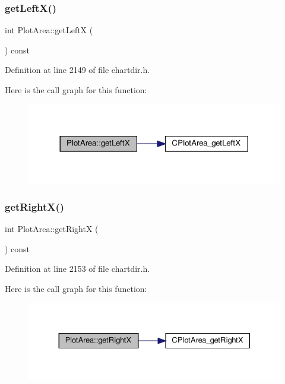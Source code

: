 \subsubsection{\texorpdfstring{get\+Left\+X()}{getLeftX()}}
{\footnotesize\ttfamily int Plot\+Area\+::get\+LeftX (\begin{DoxyParamCaption}{ }\end{DoxyParamCaption}) const\hspace{0.3cm}{\ttfamily [inline]}}



Definition at line 2149 of file chartdir.\+h.

Here is the call graph for this function\+:
\nopagebreak
\begin{figure}[H]
\begin{center}
\leavevmode
\includegraphics[width=317pt]{class_plot_area_a315c48a42edd9b50b9d9cb83f1adaaf4_cgraph}
\end{center}
\end{figure}
\mbox{\label{class_plot_area_a4295aadd8964a04a6d14509542f5201f}} 
\subsubsection{\texorpdfstring{get\+Right\+X()}{getRightX()}}
{\footnotesize\ttfamily int Plot\+Area\+::get\+RightX (\begin{DoxyParamCaption}{ }\end{DoxyParamCaption}) const\hspace{0.3cm}{\ttfamily [inline]}}



Definition at line 2153 of file chartdir.\+h.

Here is the call graph for this function\+:
\nopagebreak
\begin{figure}[H]
\begin{center}
\leavevmode
\includegraphics[width=330pt]{class_plot_area_a4295aadd8964a04a6d14509542f5201f_cgraph}
\end{center}
\end{figure}
\mbox{\label{class_plot_area_aef78dfa0ea0f6ca79ae233de69d4478b}} 
